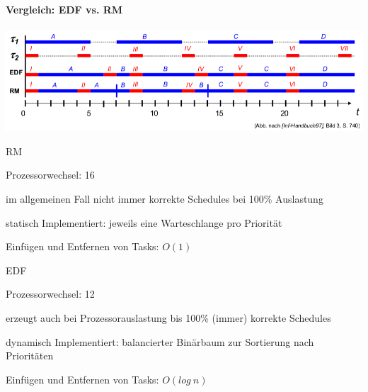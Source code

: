 \documentclass[a4paper]{article}
\begin{document}
\begin{multicols}{3}
    \paragraph{Vergleich: EDF vs. RM}
    \begin{center}
        \includegraphics[width=.8\linewidth]{Assets/AdvancedOperatingSystems-echtzeit-edf-vs-rm.png}
    \end{center}
    \begin{itemize*}
        \item RM
        \begin{itemize*}
            \item Prozessorwechsel: 16
            \item im allgemeinen Fall nicht immer korrekte Schedules bei 100\% Auslastung
            \item statisch Implementiert: jeweils eine Warteschlange pro Priorität
            \item Einfügen und Entfernen von Tasks: $O(1)$
        \end{itemize*}
        \item EDF
        \begin{itemize*}
            \item Prozessorwechsel: 12
            \item erzeugt auch bei Prozessorauslastung bis 100\% (immer) korrekte Schedules
            \item dynamisch Implementiert: balancierter Binärbaum zur Sortierung nach Prioritäten
            \item Einfügen und Entfernen von Tasks: $O(log\ n)$
        \end{itemize*}
    \end{itemize*}


\end{multicols}
\end{document}
